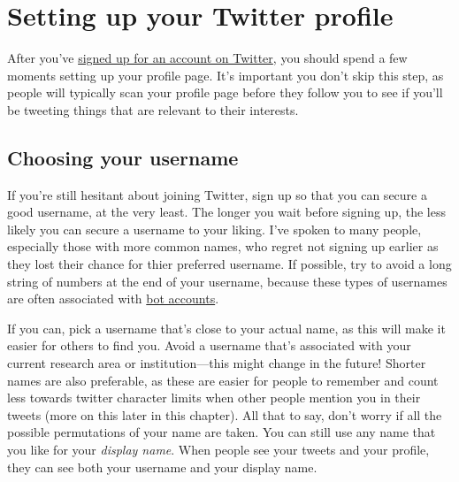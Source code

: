 \documentclass[
]{book}
\begin{document}
\hypertarget{setting-up-your-twitter-profile}{%
\section*{Setting up your Twitter profile}\label{setting-up-your-twitter-profile}}

After you've \href{https://twitter.com/}{signed up for an account on Twitter}, you should spend a few moments setting up your profile page. It's important you don't skip this step, as people will typically scan your profile page before they follow you to see if you'll be tweeting things that are relevant to their interests.

\hypertarget{choosing-your-username}{%
\subsection*{Choosing your username}\label{choosing-your-username}}

If you're still hesitant about joining Twitter, sign up so that you can secure a good username, at the very least. The longer you wait before signing up, the less likely you can secure a username to your liking. I've spoken to many people, especially those with more common names, who regret not signing up earlier as they lost their chance for thier preferred username. If possible, try to avoid a long string of numbers at the end of your username, because these types of usernames are often associated with \href{https://en.wikipedia.org/wiki/Twitter_bot}{bot accounts}.

If you can, pick a username that's close to your actual name, as this will make it easier for others to find you. Avoid a username that's associated with your current research area or institution---this might change in the future! Shorter names are also preferable, as these are easier for people to remember and count less towards twitter character limits when other people mention you in their tweets (more on this later in this chapter). All that to say, don't worry if all the possible permutations of your name are taken. You can still use any name that you like for your \emph{display name}. When people see your tweets and your profile, they can see both your username and your display name.
\end{document}
